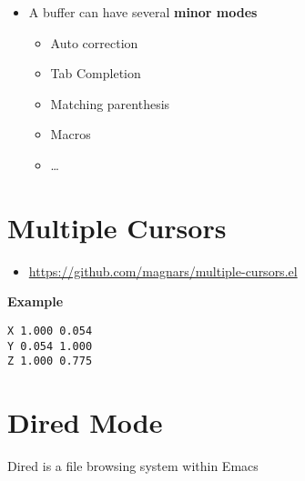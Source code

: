 \documentclass[11pt]{article}
\begin{document}
\begin{itemize}
\item A buffer can have several \textbf{minor modes}

\begin{itemize}
\item Auto correction

\item Tab Completion

\item Matching parenthesis

\item Macros

\item \ldots{}
\end{itemize}
\end{itemize}

\section{Multiple Cursors}
\label{sec:orgfdcc94d}

\begin{itemize}
\item \url{https://github.com/magnars/multiple-cursors.el}
\end{itemize}

\textbf{Example}

\begin{verbatim}
X 1.000 0.054 
Y 0.054 1.000 
Z 1.000 0.775 
\end{verbatim}

\section{Dired Mode}
\label{sec:orgba52f91}

Dired is a file browsing system within Emacs
\end{document}
